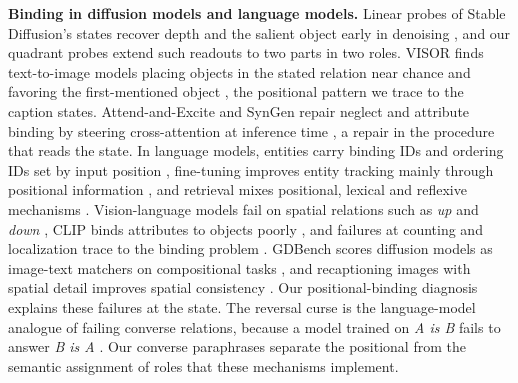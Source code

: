 \textbf{Binding in diffusion models and language models.} Linear probes of Stable Diffusion's states recover depth and the salient object early in denoising \citep{chen2023surface}, and our quadrant probes extend such readouts to two parts in two roles. VISOR finds text-to-image models placing objects in the stated relation near chance and favoring the first-mentioned object \citep{gokhale2022visor}, the positional pattern we trace to the caption states. Attend-and-Excite and SynGen repair neglect and attribute binding by steering cross-attention at inference time \citep{chefer2023attend,rassin2023syngen}, a repair in the procedure that reads the state. In language models, entities carry binding IDs \citep{feng2024} and ordering IDs set by input position \citep{dai2024binding}, fine-tuning improves entity tracking mainly through positional information \citep{prakash2024finetuning}, and retrieval mixes positional, lexical and reflexive mechanisms \citep{gurarieh2026mixing}. Vision-language models fail on spatial relations such as \emph{up} and \emph{down} \citep{kamath2023whatsup}, CLIP binds attributes to objects poorly \citep{lewis2024clip}, and failures at counting and localization trace to the binding problem \citep{campbell2024binding}. GDBench scores diffusion models as image-text matchers on compositional tasks \citep{krojer2023diffusionitm}, and recaptioning images with spatial detail improves spatial consistency \citep{chatterjee2024spright}. Our positional-binding diagnosis explains these failures at the state. The reversal curse is the language-model analogue of failing converse relations, because a model trained on \emph{A is B} fails to answer \emph{B is A} \citep{berglund2024reversal}. Our converse paraphrases separate the positional from the semantic assignment of roles that these mechanisms implement.
